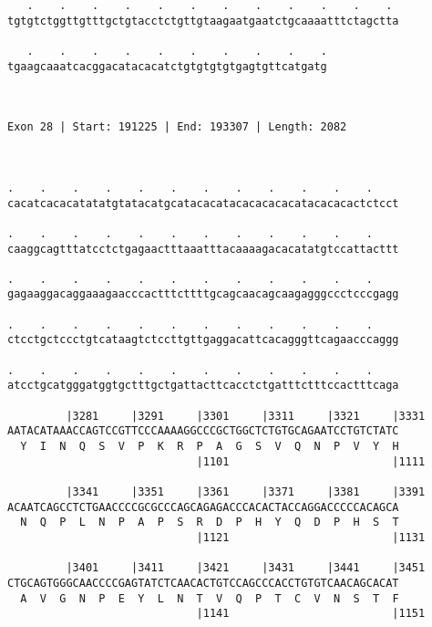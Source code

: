 \documentclass{article}
\begin{document}
\begin{Verbatim}
   .    .    .    .    .    .    .    .    .    .    .    . 
tgtgtctggttgtttgctgtacctctgttgtaagaatgaatctgcaaaatttctagctta
                                                            
   .    .    .    .    .    .    .    .    .    .
tgaagcaaatcacggacatacacatctgtgtgtgtgagtgttcatgatg
                                                 
                                                 
 
Exon 28 | Start: 191225 | End: 193307 | Length: 2082



.    .    .    .    .    .    .    .    .    .    .    .    
cacatcacacatatatgtatacatgcatacacatacacacacacatacacacactctcct
                                                            
.    .    .    .    .    .    .    .    .    .    .    .    
caaggcagtttatcctctgagaactttaaatttacaaaagacacatatgtccattacttt
                                                            
.    .    .    .    .    .    .    .    .    .    .    .    
gagaaggacaggaaagaacccactttcttttgcagcaacagcaagagggccctcccgagg
                                                            
.    .    .    .    .    .    .    .    .    .    .    .    
ctcctgctccctgtcataagtctccttgttgaggacattcacagggttcagaacccaggg
                                                            
.    .    .    .    .    .    .    .    .    .    .    .    
atcctgcatgggatggtgctttgctgattacttcacctctgatttctttccactttcaga
                                                            
         |3281     |3291     |3301     |3311     |3321     |3331
AATACATAAACCAGTCCGTTCCCAAAAGGCCCGCTGGCTCTGTGCAGAATCCTGTCTATC
  Y  I  N  Q  S  V  P  K  R  P  A  G  S  V  Q  N  P  V  Y  H
                             |1101                         |1111
  
         |3341     |3351     |3361     |3371     |3381     |3391
ACAATCAGCCTCTGAACCCCGCGCCCAGCAGAGACCCACACTACCAGGACCCCCACAGCA
  N  Q  P  L  N  P  A  P  S  R  D  P  H  Y  Q  D  P  H  S  T
                             |1121                         |1131
  
         |3401     |3411     |3421     |3431     |3441     |3451
CTGCAGTGGGCAACCCCGAGTATCTCAACACTGTCCAGCCCACCTGTGTCAACAGCACAT
  A  V  G  N  P  E  Y  L  N  T  V  Q  P  T  C  V  N  S  T  F
                             |1141                         |1151
  

\end{Verbatim}
\end{document}
